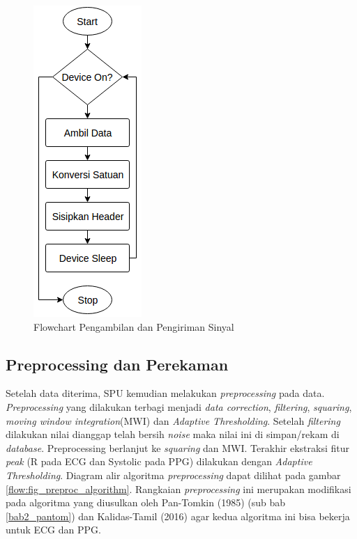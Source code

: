 \begin{figure}[H]
\centering
\includegraphics[scale=0.8]{images/flow_sample.png}
\caption{Flowchart Pengambilan dan Pengiriman Sinyal}
\label{flow:flow_sample}
\end{figure}

\subsection{Preprocessing dan Perekaman}
Setelah data diterima, SPU kemudian melakukan \textit{preprocessing} pada data. \textit{Preprocessing} yang dilakukan terbagi menjadi \textit{data correction}, \textit{filtering}, \textit{squaring}, \textit{moving window integration}(MWI) dan \textit{Adaptive Thresholding}. Setelah \textit{filtering} dilakukan nilai dianggap telah bersih \textit{noise} maka nilai ini di simpan/rekam di \textit{database}. Preprocessing berlanjut ke \textit{squaring} dan MWI. Terakhir ekstraksi fitur \textit{peak} (R pada ECG dan Systolic pada PPG) dilakukan dengan \textit{Adaptive Thresholding}. Diagram alir algoritma \textit{preprocessing} dapat dilihat pada gambar \ref{flow:fig_preproc_algorithm}. Rangkaian \textit{preprocessing} ini merupakan modifikasi pada algoritma yang diusulkan oleh Pan-Tomkin (1985) (sub bab \ref{bab2_pantom}) dan Kalidas-Tamil (2016) agar kedua algoritma ini bisa bekerja untuk ECG dan PPG.

